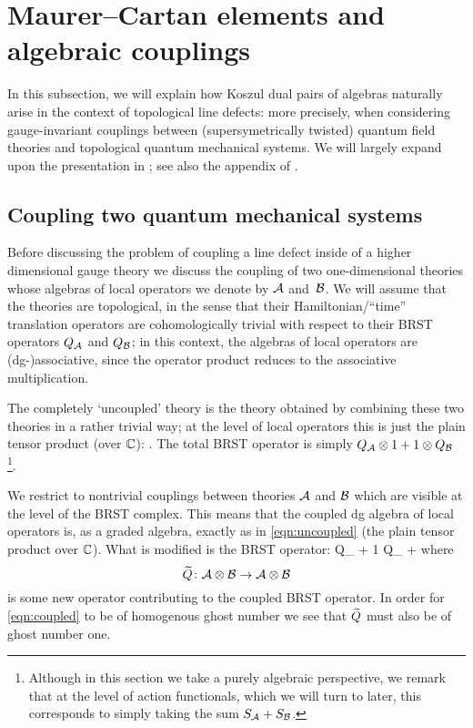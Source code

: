 \documentclass[11pt]{amsart}
\begin{document}
\section{Maurer--Cartan elements and algebraic couplings}
\label{s:algcouple}

In this subsection, we will explain how Koszul dual pairs of algebras naturally arise in the context of topological line defects: more precisely, when considering gauge-invariant couplings between (supersymetrically twisted) quantum field theories and topological quantum mechanical systems. We will largely expand upon the presentation in \cite{CP}; see also the appendix of \cite{GO}.

\subsection{Coupling two quantum mechanical systems} 

Before discussing the problem of coupling a line defect inside of a higher dimensional gauge theory we discuss the coupling of two one-dimensional theories whose algebras of local operators we denote by $\mathcal A$ and~$\mathcal B$. We will assume that the theories are topological, in the sense that their Hamiltonian/``time'' translation operators are cohomologically trivial with respect to their BRST operators $Q_\mathcal A$ and $Q_\mathcal B$; in this context, the algebras of local operators are (dg-)associative, since the operator product reduces to the associative multiplication. 

The completely `uncoupled' theory is the theory obtained by combining these two 
theories in a rather trivial way; at the level of local operators this is just the plain tensor product (over $\mathbb C$):
\beqn\label{eqn:uncoupled}
\cA \otimes \cB .
\eeqn
The total BRST operator is simply $Q_\mathcal A \otimes 1 + 1 \otimes Q_\mathcal B$ \footnote{Although in this section we take a purely algebraic perspective, we remark that at the level of action functionals, which we will turn to later, this corresponds to simply taking the sum $S_{\mathcal A} + S_{\mathcal B}$.}.

We restrict to nontrivial couplings between theories $\mathcal A$ and $\mathcal B$ which are visible at the level of the BRST complex. 
This means that the coupled dg algebra of local operators is, as a graded algebra, exactly as in \eqref{eqn:uncoupled} (the plain tensor product over $\mathbb C$). 
What is modified is the BRST operator: 
\beqn\label{eqn:coupled}
Q_{\cA}  + 1 \otimes Q_{\cB} + 
\eeqn
where 
\[
\widetilde{Q} \colon \mathcal A \otimes \mathcal B \to \mathcal A \otimes \mathcal B
\]
is some new operator contributing to the coupled BRST operator. 
In order for \eqref{eqn:coupled} to be of homogenous ghost number we see that $\widetilde{Q}$ must also be of ghost number one.
\end{document}
